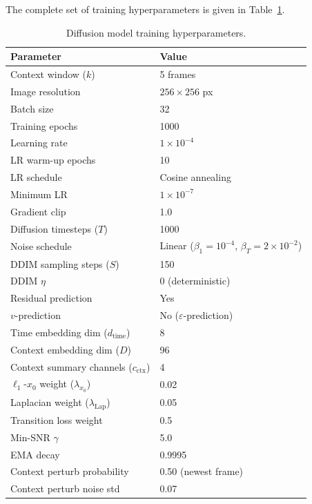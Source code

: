 \documentclass[12pt, a4paper, twoside]{report}
\newcommand{\ctx}{\text{ctx}}
\begin{document}
The complete set of training hyperparameters is given in
Table~\ref{tab:hyperparams}.

\begin{table}[H]
\centering
\caption{Diffusion model training hyperparameters.}
\label{tab:hyperparams}
\begin{tabular}{ll}
\toprule
\textbf{Parameter} & \textbf{Value} \\
\midrule
Context window ($k$)                  & 5 frames \\
Image resolution                       & $256 \times 256$ px \\
Batch size                             & 32 \\
Training epochs                        & 1000 \\
Learning rate                          & $1 \times 10^{-4}$ \\
LR warm-up epochs                      & 10 \\
LR schedule                            & Cosine annealing \\
Minimum LR                             & $1 \times 10^{-7}$ \\
Gradient clip                          & 1.0 \\
Diffusion timesteps ($T$)             & 1000 \\
Noise schedule                         & Linear ($\beta_1{=}10^{-4}$, $\beta_T{=}2{\times}10^{-2}$) \\
DDIM sampling steps ($S$)             & 150 \\
DDIM $\eta$                           & 0 (deterministic) \\
Residual prediction                    & Yes \\
$v$-prediction                         & No ($\varepsilon$-prediction) \\
Time embedding dim ($d_\text{time}$)  & 8 \\
Context embedding dim ($D$)           & 96 \\
Context summary channels ($c_\ctx$)   & 4 \\
$\ell_1$-$x_0$ weight ($\lambda_{x_0}$) & 0.02 \\
Laplacian weight ($\lambda_\text{Lap}$) & 0.05 \\
Transition loss weight                 & 0.5 \\
Min-SNR $\gamma$                       & 5.0 \\
EMA decay                              & 0.9995 \\
Context perturb probability            & 0.50 (newest frame) \\
Context perturb noise std              & 0.07 \\
\bottomrule
\end{tabular}
\end{table}
\end{document}
